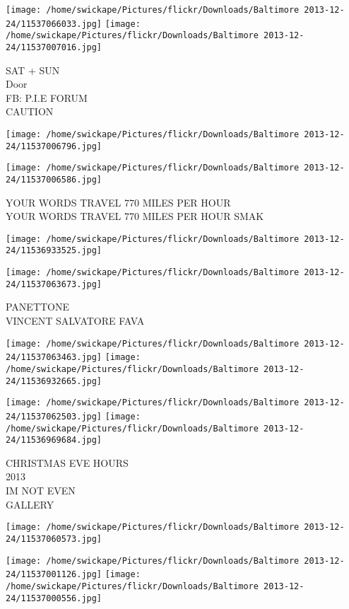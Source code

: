 \documentclass[10pt,letterpaper]{article}
\begin{document}
\texttt{[image: /home/swickape/Pictures/flickr/Downloads/Baltimore 2013-12-24/11537066033.jpg]}
\texttt{[image: /home/swickape/Pictures/flickr/Downloads/Baltimore 2013-12-24/11537007016.jpg]}

SAT + SUN\\
Door\\
FB: P.I.E FORUM\\
CAUTION
\pagebreak

\texttt{[image: /home/swickape/Pictures/flickr/Downloads/Baltimore 2013-12-24/11537006796.jpg]}

\vspace{0.25in}
\texttt{[image: /home/swickape/Pictures/flickr/Downloads/Baltimore 2013-12-24/11537006586.jpg]}

YOUR WORDS TRAVEL 770 MILES PER HOUR\\
YOUR WORDS TRAVEL 770 MILES PER HOUR SMAK
\pagebreak

\texttt{[image: /home/swickape/Pictures/flickr/Downloads/Baltimore 2013-12-24/11536933525.jpg]}

\vspace{0.25in}
\texttt{[image: /home/swickape/Pictures/flickr/Downloads/Baltimore 2013-12-24/11537063673.jpg]}

PANETTONE\\
VINCENT SALVATORE FAVA
\pagebreak

\texttt{[image: /home/swickape/Pictures/flickr/Downloads/Baltimore 2013-12-24/11537063463.jpg]}
\texttt{[image: /home/swickape/Pictures/flickr/Downloads/Baltimore 2013-12-24/11536932665.jpg]}

\texttt{[image: /home/swickape/Pictures/flickr/Downloads/Baltimore 2013-12-24/11537062503.jpg]}
\texttt{[image: /home/swickape/Pictures/flickr/Downloads/Baltimore 2013-12-24/11536969684.jpg]}

CHRISTMAS EVE HOURS\\
2013\\
IM NOT EVEN\\
GALLERY
\pagebreak

\texttt{[image: /home/swickape/Pictures/flickr/Downloads/Baltimore 2013-12-24/11537060573.jpg]}

\vspace{0.25in}
\texttt{[image: /home/swickape/Pictures/flickr/Downloads/Baltimore 2013-12-24/11537001126.jpg]}
\texttt{[image: /home/swickape/Pictures/flickr/Downloads/Baltimore 2013-12-24/11537000556.jpg]}
\end{document}
